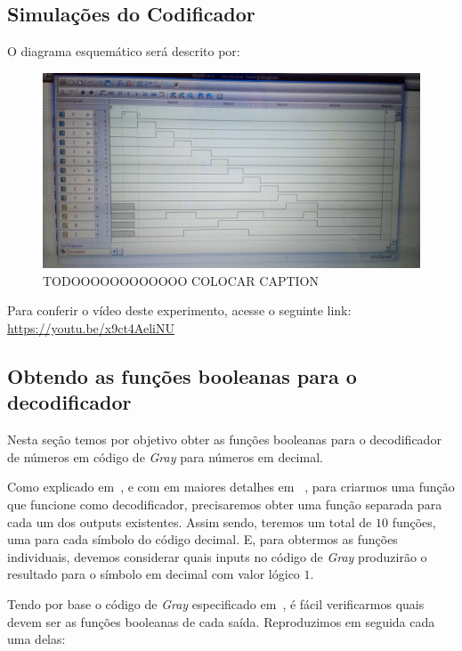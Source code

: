 \documentclass[12pt]{article}
\begin{document}
\subsection{Simulações do Codificador}\label{sec:2.2}

O diagrama esquemático será descrito por:

\begin{figure}[H]
    \centering
    \includegraphics[width=12cm]{Exp05/2.2.png}
    \caption{TODOOOOOOOOOOOO COLOCAR CAPTION}
    \label{fig:2.2.png}
\end{figure}

Para conferir o vídeo deste experimento, acesse o seguinte link:
\href{https://youtu.be/x9ct4AeliNU}{https://youtu.be/x9ct4AeliNU}

\subsection{Obtendo as funções booleanas para o decodificador}\label{sec:2.3}

Nesta seção temos por objetivo obter as funções booleanas para o decodificador
de números em código de \emph{Gray} para números em decimal.

Como explicado em~\cite{codificadores_mandelli}, e com em maiores detalhes em
~\cite{codificadores_e_decodificadores}, para criarmos uma função que funcione
como decodificador, precisaremos obter uma função separada para cada um dos
outputs existentes. Assim sendo, teremos um total de $10$ funções, uma para cada
símbolo do código decimal. E, para obtermos as funções individuais, devemos
considerar quais inputs no código de \emph{Gray} produzirão o resultado para o
símbolo em decimal com valor lógico $1$.

Tendo por base o código de \emph{Gray} especificado
em~\cite{gray_code_table}, é fácil
verificarmos quais devem ser as funções booleanas de cada saída. Reproduzimos em
seguida cada uma delas:
\end{document}
